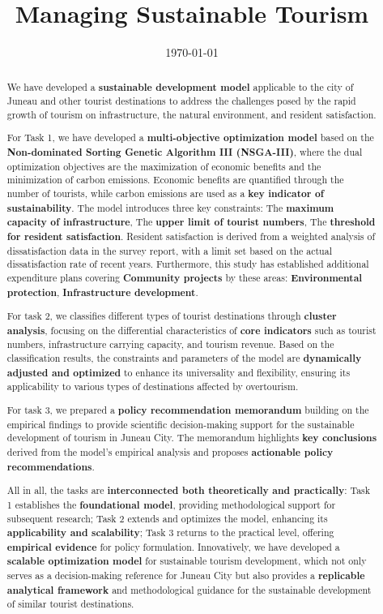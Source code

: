 \documentclass{mcmthesis}
\title{Managing Sustainable Tourism}
\date{\today}
\begin{document}
\begin{abstract}

  We have developed a \textbf{sustainable development model} applicable to the city of Juneau and 
other tourist destinations to address the challenges posed by the rapid growth of tourism
on infrastructure, the natural environment, and resident satisfaction.\par  
For Task 1, we have developed a \textbf{multi-objective optimization model} based on the 
\textbf{Non-dominated Sorting Genetic Algorithm III (NSGA-III)}, where the dual optimization 
objectives are the maximization of economic benefits and the minimization of carbon emissions. 
Economic benefits are quantified through the number of tourists, while carbon emissions 
are used as a \textbf{key indicator of sustainability}. The model introduces three key constraints:  
The \textbf{maximum capacity of infrastructure},
The \textbf{upper limit of tourist numbers},
The \textbf{threshold for resident satisfaction}.
Resident satisfaction is derived from a weighted analysis of dissatisfaction data in the 
survey report, with a 
limit set based on the actual 
dissatisfaction rate of recent years. 
Furthermore, this study has established additional 
expenditure plans covering \textbf{Community projects} by these areas:
\textbf{Environmental protection},
\textbf{Infrastructure development}. \par
For task 2, we classifies different types of tourist destinations through \textbf{cluster analysis}, 
focusing on the differential characteristics of \textbf{core indicators} such as tourist numbers, 
infrastructure carrying capacity, and tourism revenue. Based on the classification results, 
the constraints and parameters of the model are \textbf{dynamically adjusted and optimized} to enhance its 
universality and flexibility, ensuring its applicability to various types of destinations affected 
by overtourism.\par

For task 3, we prepared a \textbf{policy recommendation memorandum} building on the empirical findings to 
provide scientific decision-making support for the sustainable development of tourism in Juneau 
City. The memorandum highlights \textbf{key conclusions} derived from the model's empirical analysis and 
proposes \textbf{actionable policy recommendations}.\par

All in all, the tasks are \textbf{interconnected both theoretically and practically}: Task 1 establishes the \textbf{foundational 
model}, providing methodological support for subsequent research; Task 2 extends and optimizes the 
model, enhancing its \textbf{applicability and scalability}; Task 3 returns to the practical level, offering 
\textbf{empirical evidence} for policy formulation. Innovatively, we have developed a \textbf{scalable optimization 
model} for sustainable tourism development, which not only serves as a decision-making reference for 
Juneau City but also provides a \textbf{replicable analytical framework} and methodological guidance for the 
sustainable development of similar tourist destinations.


\end{abstract}
\end{document}
